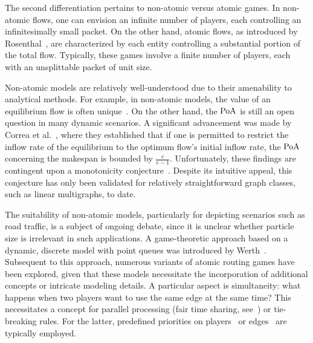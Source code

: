 The second differentiation pertains to non-atomic versus atomic games. In non-atomic flows, one can envision an infinite number of players, each controlling an infinitesimally small packet. %
On the other hand, atomic flows, as introduced by Rosenthal~\cite{rosenthal1973network}, are characterized by each entity controlling a substantial portion of the total flow. Typically, these games involve a finite number of players, each with an unsplittable packet of unit size.

Non-atomic models are relatively well-understood due to their amenability to analytical methods. 
For example, in non-atomic models, the value of an equilibrium flow is often unique~\cite{cominetti2011existence}.
On the other hand, the $\operatorname*{PoA}$ is still an open question in many dynamic scenarios. A significant advancement was made by Correa et al.~\cite{DBLP:journals/mor/CorreaCO22}, where they established that if one is permitted to restrict the inflow rate of the equilibrium to the optimum flow’s initial inflow rate, the $\operatorname*{PoA}$ concerning the makespan is bounded by $\frac{e}{e-1}$. Unfortunately, these findings are contingent upon a monotonicity conjecture~\cite{DBLP:journals/mor/CorreaCO22}. Despite its intuitive appeal, this conjecture has only been validated for relatively straightforward graph classes, such as linear multigraphs, to date.

The suitability of non-atomic models, particularly for depicting scenarios such as road traffic, is a subject of ongoing debate, since it is unclear whether particle size is irrelevant in such applications.
A game-theoretic approach based on a dynamic, discrete model with point queues was introduced by Werth~\cite{WERTH201418}.
Subsequent to this approach, numerous variants of atomic routing games have been explored, given that these models necessitate the incorporation of additional concepts or intricate modeling details. A particular aspect is simultaneity: what happens when two players want to use the same edge at the same time? This necessitates a concept for parallel processing (fair time sharing, see~\cite{hoefer2011competitive}) or tie-breaking rules. For the latter, predefined priorities on players~\cite{harks2018competitive,WERTH201418} or edges~\cite{DBLP:conf/sigecom/CaoCCW17,scheffler2022routing,WERTH201418} are typically employed. %

